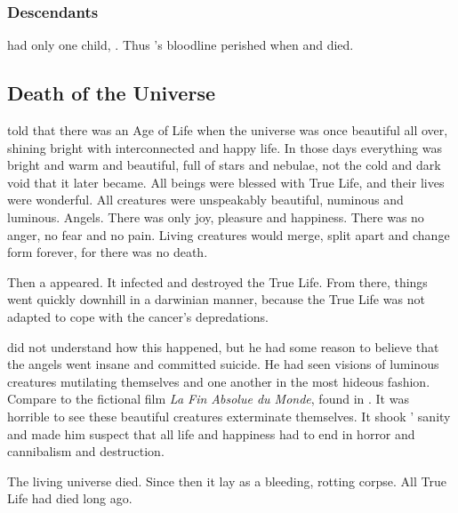 \subsubsection{Descendants}
\Sethicus had only one child, . 
Thus \Sethicus's bloodline perished when \Nexagglachel and  died.









\subsection{Death of the Universe}
\Sethicus told that there was an Age of Life when the universe was once beautiful all over, shining bright with interconnected and happy life. 
In those days everything was bright and warm and beautiful, full of stars and nebulae, not the cold and dark void that it later became. 
All beings were blessed with True Life, and their lives were wonderful. 
All creatures were unspeakably beautiful, numinous and luminous. 
Angels.
There was only joy, pleasure and happiness. 
There was no anger, no fear and no pain. 
Living creatures would merge, split apart and change form forever, for there was no death. 

Then a  appeared. 
It infected and destroyed the True Life. 
From there, things went quickly downhill in a darwinian manner, because the True Life was not adapted to cope with the cancer's depredations. 

\Sethicus did not understand how this happened, but he had some reason to believe that the angels went insane and committed suicide.
He had seen visions of luminous creatures mutilating themselves and one another in the most hideous fashion. 
Compare to the fictional film \emph{La Fin Absolue du Monde}, found in \cite{Movie:CigaretteBurns}.
It was horrible to see these beautiful creatures exterminate themselves. 
It shook \Sethicus' sanity and made him suspect that all life and happiness had to end in horror and cannibalism and destruction. 

The living universe died. 
Since then it lay as a bleeding, rotting corpse. 
All True Life had died long ago. 


